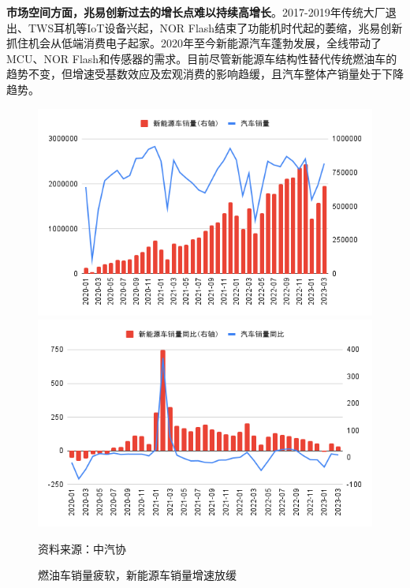 \documentclass[a4paper,12pt]{ctexart}
\begin{document}
\textbf{市场空间方面，兆易创新过去的增长点难以持续高增长}。2017-2019年传统大厂退出、TWS耳机等IoT设备兴起，NOR Flash结束了功能机时代起的萎缩，兆易创新抓住机会从低端消费电子起家。2020年至今新能源汽车蓬勃发展，全线带动了MCU、NOR Flash和传感器的需求。目前尽管新能源车结构性替代传统燃油车的趋势不变，但增速受基数效应及宏观消费的影响趋缓，且汽车整体产销量处于下降趋势。
\begin{figure}[H]
    \caption{燃油车销量疲软，新能源车销量增速放缓}
    \begin{minipage}{0.48\linewidth}
        \centering
        \includegraphics[width=\linewidth]{img/car11.png}
    \end{minipage}
    \begin{minipage}{0.48\linewidth}
        \centering
        \includegraphics[width=\linewidth]{img/car2.png}
    \end{minipage}
    \par\footnotesize{资料来源：中汽协}
\end{figure}
\end{document}
